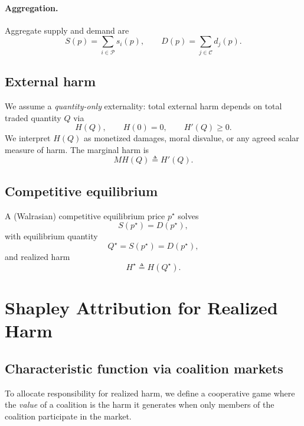 \documentclass[journal, a4paper]{IEEEtran}
\begin{document}
\paragraph{Aggregation.}
Aggregate supply and demand are
\begin{equation}
S(p)=\sum_{i\in \mathcal{P}} s_i(p),\qquad D(p)=\sum_{j\in \mathcal{C}} d_j(p).
\end{equation}

\subsection{External harm}
We assume a \emph{quantity-only} externality: total external harm depends on total traded quantity $Q$ via
\begin{equation}
H(Q),\qquad H(0)=0,\qquad H'(Q)\ge 0.
\end{equation}
We interpret $H(Q)$ as monetized damages, moral disvalue, or any agreed scalar measure of harm. The marginal harm is
\begin{equation}
MH(Q) \triangleq H'(Q).
\end{equation}

\subsection{Competitive equilibrium}
A (Walrasian) competitive equilibrium price $p^\star$ solves
\begin{equation}
S(p^\star)=D(p^\star),
\end{equation}
with equilibrium quantity
\begin{equation}
Q^\star = S(p^\star)=D(p^\star),
\end{equation}
and realized harm
\begin{equation}
H^\star \triangleq H(Q^\star).
\end{equation}

\section{Shapley Attribution for Realized Harm}
\subsection{Characteristic function via coalition markets}
To allocate responsibility for realized harm, we define a cooperative game where the \emph{value} of a coalition is the harm it generates when only members of the coalition participate in the market.
\end{document}
